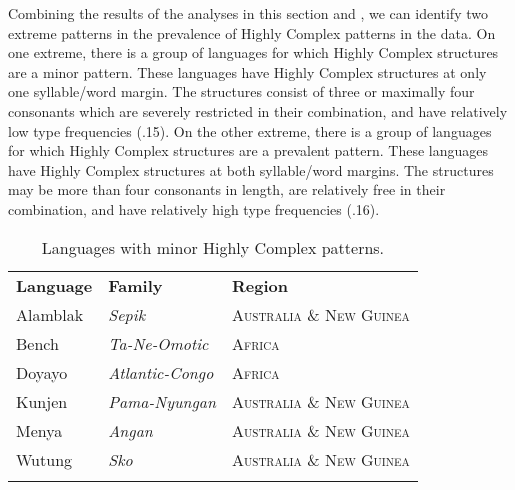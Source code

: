   Combining the results of the analyses in this section and , we can identify two extreme patterns in the prevalence of Highly Complex patterns in the data. On one extreme, there is a group of languages for which Highly Complex structures are a minor pattern. These languages have Highly Complex structures at only one syllable/word margin. The structures consist of three or maximally four consonants which are severely restricted in their combination, and have relatively low type frequencies (.15). On the other extreme, there is a group of languages for which Highly Complex structures are a prevalent pattern. These languages have Highly Complex structures at both syllable/word margins. The structures may be more than four consonants in length, are relatively free in their combination, and have relatively high type frequencies (.16).

\begin{table}
\begin{tabularx}{\textwidth}{XXX}
\lsptoprule

\textbf{Language} & \textbf{Family} & \textbf{Region}\\
Alamblak & \textit{Sepik} & \textsc{Australia} \textsc{\&} \textsc{New} \textsc{Guinea}\\
Bench & \textit{Ta-Ne-Omotic} & \textsc{Africa}\\
Doyayo & \textit{Atlantic-Congo} & \textsc{Africa}\\
Kunjen & \textit{Pama-Nyungan} & \textsc{Australia} \textsc{\&} \textsc{New} \textsc{Guinea}\\
Menya & \textit{Angan} & \textsc{Australia} \textsc{\&} \textsc{New} \textsc{Guinea}\\
Wutung & \textit{Sko} & \textsc{Australia} \textsc{\&} \textsc{New} \textsc{Guinea}\\
\lspbottomrule
\end{tabularx}
\caption{\label{3.15}Languages with minor Highly Complex patterns.}
\end{table}




